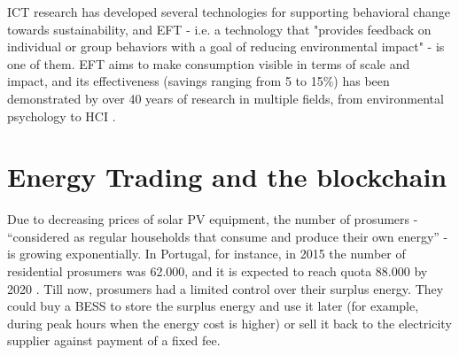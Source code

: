 \ac{ICT} research has developed several technologies for supporting behavioral change towards sustainability, and \ac{EFT} - i.e. a technology that "provides feedback on individual or group behaviors with a goal of reducing environmental impact" \cite{Froehlich2010} - is one of them. \ac{EFT} aims to make consumption visible in terms of scale and impact, and its effectiveness (savings ranging from 5 to 15\%) has been demonstrated by over 40 years of research in multiple fields, from environmental psychology to \ac{HCI} \cite{Wang1990, Darby2006, Froehlich2010}.

\section{Energy Trading and the blockchain}

Due to decreasing prices of solar \ac{PV} equipment, the number of prosumers - “considered as regular households that consume and produce their own energy” \cite{Prosumers} - is growing exponentially. In Portugal, for instance, in 2015 the number of residential prosumers was 62.000, and it is expected to reach quota 88.000 by 2020 \cite{EuropeanComissionStudy}. Till now, prosumers had a limited control over their surplus energy. They could buy a \ac{BESS} to store the surplus energy and use it later (for example, during peak hours when the energy cost is higher) or sell it back to the electricity supplier against payment of a fixed fee.




